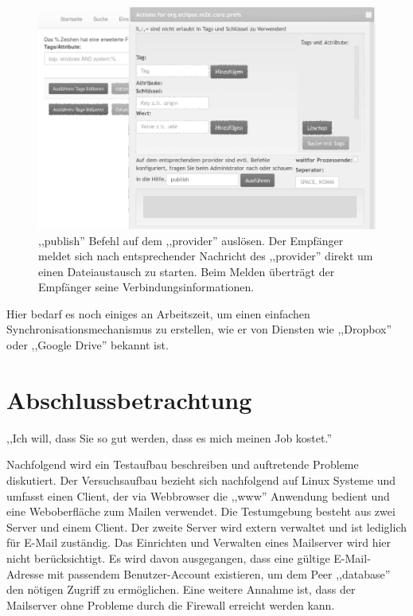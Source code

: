 \documentclass[oneside, ngerman, toc=bibliography,bibliography=totoc,listof=entryprefix, open=right,numbers=noenddot,fontsize=12pt]{scrbook}
\newcommand\chapmd[2]{\begin{mdframed}[%
		rightline=false,leftline=false,topline=false,bottomline=false,frametitlerule=false,
		userdefinedwidth=\textwidth,frametitlealignment=\flushright, %
		frametitlerulecolor=black,frametitle={\small #1}]
		\flushright{} \footnotesize{} #2
	\end{mdframed}}
\begin{document}
\begin{figure}[htbp] 
    \centering
    \includegraphics[width=\textwidth]{Masterarbeit_Bilder/www_cmd_publish.png}
    \caption{ ,,publish'' Befehl auf dem ,,provider'' auslösen. Der Empfänger meldet sich nach entsprechender Nachricht des  ,,provider'' direkt um einen Dateiaustausch zu starten. Beim Melden überträgt der Empfänger seine Verbindungsinformationen.}
    \label{fig:www-cmd-pub}
\end{figure}  

\bigskip

Hier bedarf es noch einiges an Arbeitszeit, um einen einfachen Synchronisationsmechanismus zu erstellen, wie er von Diensten wie ,,Dropbox'' oder ,,Google Drive'' bekannt ist.

 
\chapter{Abschlussbetrachtung}
 
\chapmd{Projektmanagementkurs Universität Duisburg-Essen}{,,Ich will, dass Sie so gut werden, dass es mich meinen Job kostet.''}


Nachfolgend wird ein Testaufbau beschreiben und auftretende Probleme diskutiert. Der Versuchsaufbau bezieht sich nachfolgend auf Linux Systeme und umfasst einen Client, der via Webbrowser die ,,www'' Anwendung bedient und eine Weboberfläche zum Mailen verwendet.
Die Testumgebung besteht aus zwei Server und einem Client. Der zweite Server wird extern verwaltet und ist lediglich für E-Mail zuständig. Das Einrichten und Verwalten eines Mailserver wird hier nicht berücksichtigt. Es wird davon ausgegangen, dass eine gültige E-Mail-Adresse mit passendem Benutzer-Account existieren, um dem Peer ,,database'' den nötigen Zugriff zu ermöglichen. Eine weitere Annahme ist, dass der Mailserver ohne Probleme durch die Firewall erreicht werden kann.
\end{document}
